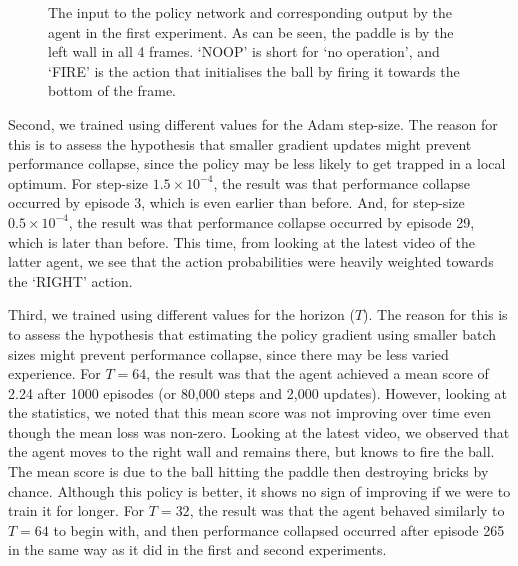 \documentclass[12pt,a4paper]{article}
\begin{document}
\begin{figure}[ht]
    \centering
    \hfill
    \caption{The input to the policy network and corresponding output by the agent in the first experiment. As can be seen, the paddle is by the left wall in all 4 frames. `NOOP' is short for `no operation', and `FIRE' is the action that initialises the ball by firing it towards the bottom of the frame.}
\end{figure}

Second, we trained using different values for the Adam step-size. The reason for this is to assess the hypothesis that smaller gradient updates might prevent performance collapse, since the policy may be less likely to get trapped in a local optimum. For step-size $1.5 \times 10^{-4}$, the result was that performance collapse occurred by episode 3, which is even earlier than before. And, for step-size $0.5 \times 10^{-4}$, the result was that performance collapse occurred by episode 29, which is later than before. This time, from looking at the latest video of the latter agent, we see that the action probabilities were heavily weighted towards the `RIGHT' action. 

Third, we trained using different values for the horizon ($T$). The reason for this is to assess the hypothesis that estimating the policy gradient using smaller batch sizes might prevent performance collapse, since there may be less varied experience. For $T=64$, the result was that the agent achieved a mean score of 2.24 after 1000 episodes (or 80,000 steps and 2,000 updates). However, looking at the statistics, we noted that this mean score was not improving over time even though the mean loss was non-zero. Looking at the latest video, we observed that the agent moves to the right wall and remains there, but knows to fire the ball. The mean score is due to the ball hitting the paddle then destroying bricks by chance. Although this policy is better, it shows no sign of improving if we were to train it for longer. For $T=32$, the result was that the agent behaved similarly to $T=64$ to begin with, and then performance collapsed occurred after episode 265 in the same way as it did in the first and second experiments.
\end{document}

